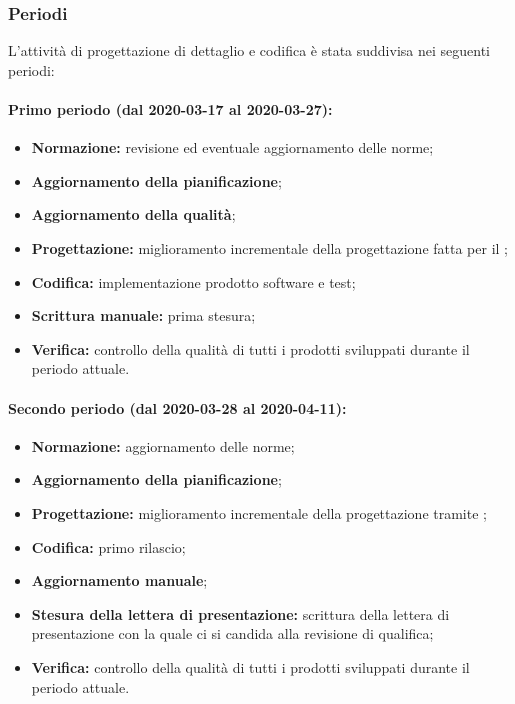 			\subsubsection{Periodi}
			
				L'attività di progettazione di dettaglio e codifica è stata suddivisa nei seguenti periodi:
				
				\paragraph{Primo periodo (dal 2020-03-17 al 2020-03-27):}
				
					\begin{itemize}
						\item \textbf{Normazione:} revisione ed eventuale aggiornamento delle norme;
						\item \textbf{Aggiornamento della pianificazione};
						\item \textbf{Aggiornamento della qualità};
						\item \textbf{Progettazione:} miglioramento incrementale della progettazione fatta per il ;
						\item \textbf{Codifica:} implementazione prodotto software e test;
						\item \textbf{Scrittura manuale:} prima stesura;
						\item \textbf{Verifica:} controllo della qualità di tutti i prodotti sviluppati durante il periodo attuale.
					\end{itemize} 	
				
				\paragraph{Secondo periodo (dal 2020-03-28 al 2020-04-11):}
				
					\begin{itemize}
						\item \textbf{Normazione:} aggiornamento delle norme;
						\item \textbf{Aggiornamento della pianificazione};
						\item \textbf{Progettazione:} miglioramento incrementale della progettazione tramite ;
						\item \textbf{Codifica:} primo rilascio;
						\item \textbf{Aggiornamento manuale};
						\item \textbf{Stesura della lettera di presentazione:} scrittura della lettera di presentazione con la quale ci si candida alla revisione di qualifica;
						\item \textbf{Verifica:} controllo della qualità di tutti i prodotti sviluppati durante il periodo attuale.
					\end{itemize}
		
